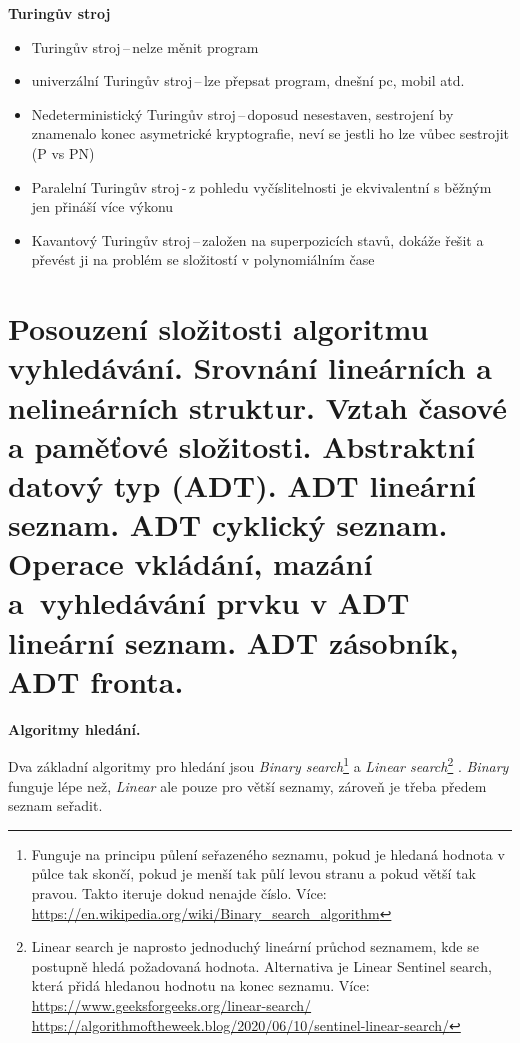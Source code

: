 \begin{Large}\vspace{0,5cm} \textbf{Turingův stroj}
\end{Large}

\begin{itemize}
    \item Turingův stroj\,--\,nelze měnit program
    \item univerzální Turingův stroj\,--\,lze přepsat program, dnešní pc, mobil atd.
    \item Nedeterministický Turingův stroj\,--\,doposud nesestaven, sestrojení by znamenalo konec asymetrické kryptografie, neví se jestli ho lze vůbec sestrojit (P vs PN)
    \item Paralelní Turingův stroj\,-\,z pohledu vyčíslitelnosti je ekvivalentní s běžným jen přináší více výkonu
    \item Kavantový Turingův stroj\,--\,založen na superpozicích stavů, dokáže řešit  a převést ji na problém se složitostí v polynomiálním čase
\end{itemize}








\newpage
\section{Posouzení složitosti algoritmu vyhledávání. Srovnání lineárních a nelineárních struktur. Vztah časové a paměťové složitosti. Abstraktní datový typ (ADT). ADT lineární seznam. ADT cyklický seznam. Operace vkládání, mazání a~vyhledávání prvku v ADT lineární seznam. ADT zásobník, ADT fronta.}

\begin{Large}\vspace{0,5cm} \textbf{Algoritmy hledání.}
\end{Large}

Dva základní algoritmy pro hledání jsou \textit{Binary search}\footnote{Funguje na principu půlení seřazeného seznamu, pokud je hledaná hodnota v půlce tak skončí, pokud je menší tak půlí levou stranu a pokud větší tak pravou. Takto iteruje dokud nenajde číslo. Více:  \url{https://en.wikipedia.org/wiki/Binary_search_algorithm}} a \textit{Linear search}\footnote{Linear search je naprosto jednoduchý lineární průchod seznamem, kde se postupně hledá požadovaná hodnota. Alternativa je Linear Sentinel search, která přidá hledanou hodnotu na konec seznamu. Více: \url{https://www.geeksforgeeks.org/linear-search/} \url{https://algorithmoftheweek.blog/2020/06/10/sentinel-linear-search/}} . \textit{Binary} funguje lépe než, \textit{Linear} ale pouze pro větší seznamy, zároveň je třeba předem seznam seřadit. \\

